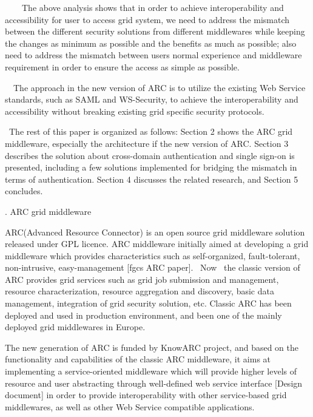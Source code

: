 \documentclass{article}
\begin{document}
\ \ \ \ The above analysis shows that in order to achieve
interoperability and accessibility for user to access grid system, we
need to address the mismatch between the different security solutions
from different middlewares while keeping the changes as minimum as
possible and the benefits as much as possible; also need to address the
mismatch between user{\textquotesingle}s normal experience and
middleware requirement in order to ensure the access as simple as
possible.

\ \ The approach in the new version of ARC is to utilize the existing
Web Service standards, such as SAML and WS-Security, to achieve the
interoperability and accessibility without breaking existing grid
specific security protocols.

\ The rest of this paper is organized as follows: Section 2 shows the
ARC grid middleware, especially the architecture if the new version of
ARC. Section 3 describes the solution about cross-domain authentication
and single sign-on is presented, including a few solutions implemented
for bridging the mismatch in terms of authentication. Section 4
discusses the related research, and Section 5 concludes.


\bigskip

{. ARC grid middleware 
\par}

ARC(Advanced Resource Connector) is an open source grid middleware
solution released under GPL licence. ARC middleware initially aimed at
developing a grid middleware which provides characteristics such as
self-organized, fault-tolerant, non-intrusive, easy-management [fgcs
ARC paper]. \ Now \ the classic version of ARC provides grid services
such as grid job submission and management, resource characterization,
resource aggregation and discovery, basic data management, integration
of grid security solution, etc. Classic ARC has been deployed and used
in production environment, and been one of the mainly deployed grid
middlewares in Europe.

The new generation of ARC is funded by KnowARC project, and based on the
functionality and capabilities of the classic ARC middleware, it aims
at implementing a service-oriented middleware which will provide higher
levels of resource and user abstracting through well-defined web
service interface [Design document] in order to provide
interoperability with other service-based grid middlewares, as well as
other Web Service compatible applications.
\end{document}

